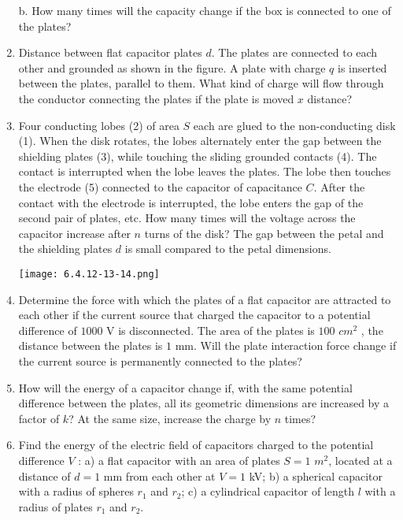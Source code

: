 \documentclass{article}
\begin{document}
\begin{enumerate}[label=6.4.\arabic*]
b. How many times will the capacity change if the box is connected to one of the plates?

\item Distance between flat capacitor plates $d$. The plates are connected to each other and grounded as shown in the figure. A plate with charge $q$ is inserted between the plates, parallel to them. What kind of charge will flow through the conductor connecting the plates if the plate is moved $x$ distance?

\item Four conducting lobes (2) of area $S$ each are glued to the non-conducting disk (1). When the disk rotates, the lobes alternately enter the gap between the shielding plates (3), while touching the sliding grounded contacts (4). The contact is interrupted when the lobe leaves the plates. The lobe then touches the electrode (5) connected to the capacitor of capacitance $C$. After the contact with the electrode is interrupted, the lobe enters the gap of the second pair of plates, etc. How many times will the voltage across the capacitor increase after $n$ turns of the disk? The gap between the petal and the shielding plates $d$ is small compared to the petal dimensions.

\begin{center}
    \texttt{[image: 6.4.12-13-14.png]}
\end{center}

\item Determine the force with which the plates of a flat capacitor are attracted to each other if the current source that charged the capacitor to a potential difference of $1000$ V is disconnected. The area of the plates is $100$ $cm^2$ , the distance between the plates is $1$ mm. Will the plate interaction force change if the current source is permanently connected to the plates?

\item How will the energy of a capacitor change if, with the same potential difference between the plates, all its geometric dimensions are increased by a factor of $k$? At the same size, increase the charge by $n$ times?

\item Find the energy of the electric field of capacitors charged to the potential difference $V$ : a) a flat capacitor with an area of plates $S = 1$ $m^2$, located at a distance of $d = 1$ mm from each other at $V = 1$ kV; b) a spherical capacitor with a radius of spheres $r_1$ and $r_2$; c) a cylindrical capacitor of length $l$ with a radius of plates $r_1$ and $r_2$.


\end{enumerate}
\end{document}
